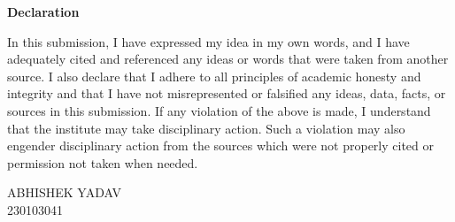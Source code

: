 \documentclass[a4paper, 11pt, oneside]{report}
\begin{document}

\begin{center}
   { \LARGE \textbf{Declaration}}
\end{center}
In this submission, I have expressed my idea in my own words, and I have adequately cited and referenced any ideas or words that were taken from another source. I also declare that I adhere to all principles of academic honesty and integrity and that I have not misrepresented or falsified any ideas, data, facts, or sources in this submission. If any violation of the above is made, I understand that the institute may take disciplinary action. Such a violation may also engender disciplinary action from the sources which were not properly cited or permission not taken when needed.

\vspace{1cm}\hspace{8.35cm} ABHISHEK YADAV \\
\vspace{1cm}\hspace{9cm} 230103041 \\

\newpage
\end{document}
